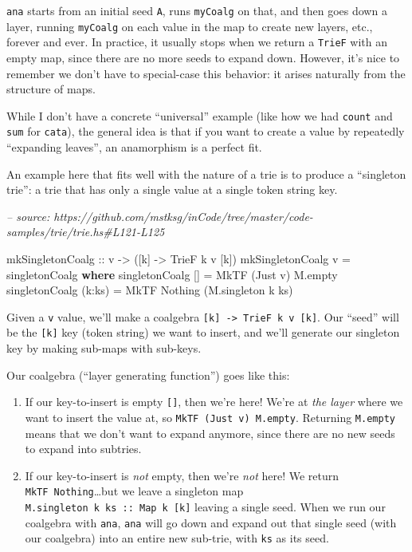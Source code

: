 \documentclass[]{article}
\newenvironment{Shaded}{}{}
\newcommand{\CommentTok}[1]{\textcolor[rgb]{0.38,0.63,0.69}{\textit{#1}}}
\newcommand{\DataTypeTok}[1]{\textcolor[rgb]{0.56,0.13,0.00}{#1}}
\newcommand{\FunctionTok}[1]{\textcolor[rgb]{0.02,0.16,0.49}{#1}}
\newcommand{\KeywordTok}[1]{\textcolor[rgb]{0.00,0.44,0.13}{\textbf{#1}}}
\newcommand{\NormalTok}[1]{#1}
\newcommand{\OtherTok}[1]{\textcolor[rgb]{0.00,0.44,0.13}{#1}}
\begin{document}
\texttt{ana} starts from an initial seed \texttt{A}, runs \texttt{myCoalg} on
that, and then goes down a layer, running \texttt{myCoalg} on each value in the
map to create new layers, etc., forever and ever. In practice, it usually stops
when we return a \texttt{TrieF} with an empty map, since there are no more seeds
to expand down. However, it's nice to remember we don't have to special-case
this behavior: it arises naturally from the structure of maps.

While I don't have a concrete ``universal'' example (like how we had
\texttt{count} and \texttt{sum} for \texttt{cata}), the general idea is that if
you want to create a value by repeatedly ``expanding leaves'', an anamorphism is
a perfect fit.

An example here that fits well with the nature of a trie is to produce a
``singleton trie'': a trie that has only a single value at a single token string
key.

\begin{Shaded}
\begin{Highlighting}[]
\CommentTok{-- source: https://github.com/mstksg/inCode/tree/master/code-samples/trie/trie.hs#L121-L125}

\OtherTok{mkSingletonCoalg ::}\NormalTok{ v }\OtherTok{->}\NormalTok{ ([k] }\OtherTok{->} \DataTypeTok{TrieF}\NormalTok{ k v [k])}
\NormalTok{mkSingletonCoalg v }\FunctionTok{=}\NormalTok{ singletonCoalg}
  \KeywordTok{where}
\NormalTok{    singletonCoalg []     }\FunctionTok{=} \DataTypeTok{MkTF}\NormalTok{ (}\DataTypeTok{Just}\NormalTok{ v) M.empty}
\NormalTok{    singletonCoalg (k}\FunctionTok{:}\NormalTok{ks) }\FunctionTok{=} \DataTypeTok{MkTF} \DataTypeTok{Nothing}\NormalTok{  (M.singleton k ks)}
\end{Highlighting}
\end{Shaded}

Given a \texttt{v} value, we'll make a coalgebra
\texttt{{[}k{]}\ -\textgreater{}\ TrieF\ k\ v\ {[}k{]}}. Our ``seed'' will be
the \texttt{{[}k{]}} key (token string) we want to insert, and we'll generate
our singleton key by making sub-maps with sub-keys.

Our coalgebra (``layer generating function'') goes like this:

\begin{enumerate}
\def\labelenumi{\arabic{enumi}.}
\item
  If our key-to-insert is empty \texttt{{[}{]}}, then we're here! We're at
  \emph{the layer} where we want to insert the value at, so
  \texttt{MkTF\ (Just\ v)\ M.empty}. Returning \texttt{M.empty} means that we
  don't want to expand anymore, since there are no new seeds to expand into
  subtries.
\item
  If our key-to-insert is \emph{not} empty, then we're \emph{not} here! We
  return \texttt{MkTF\ Nothing}\ldots{}but we leave a singleton map
  \texttt{M.singleton\ k\ ks\ ::\ Map\ k\ {[}k{]}} leaving a single seed. When
  we run our coalgebra with \texttt{ana}, \texttt{ana} will go down and expand
  out that single seed (with our coalgebra) into an entire new sub-trie, with
  \texttt{ks} as its seed.
\end{enumerate}
\end{document}
